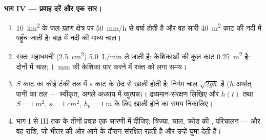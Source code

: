 \begin{problem}
\medskip
\noindent\textbf{भाग IV --- प्रवाह दरें और एक सार।}
\begin{enumerate}[resume]
  \item \qty{10}{km^2} के जल-ग्रहण क्षेत्र पर \qty{50}{mm/h} से वर्षा होती है
        और वह सारी \qty{40}{m^2} काट की नदी में पहुँच जाती है: बाढ़ में
        नदी की माध्य चाल।
  \item रक्त: महाधमनी (\qty{2.5}{cm^2}) \qty{5.0}{L/min} ले जाती है;
        केशिकाओं की कुल काट \qty{0.25}{m^2} है: दोनों में चाल;
        \qty{1}{mm} की केशिका पार करने में रक्त को लगा समय।
  \item $S$ काट का कोई टंकी तल में $s$ काट के छेद से खाली होती है;
        निर्गम चाल $\sqrt{2gh}$ है ($h$ अर्थात् पानी का तल
        --- स्वीकृत, अगले अध्याय में व्युत्पन्न)। द्रव्यमान-संरक्षण
        लिखिए और $h(t)$ तथा
        $S = \qty{1}{m^2}$, $s = \qty{1}{cm^2}$, $h_0 = \qty{1}{m}$ के लिए खाली होने का समय निकालिए।
  \item भाग I से III तक के तीनों प्रवाह एक सारणी में दीजिए: त्रिज्या,
        चाल, क्रोड की , परिचालन --- और वह राशि, जो
        भीतर की ओर आने के दौरान संरक्षित रहती है और उन्हें
        घुमा देती है।
\end{enumerate}
\end{problem}
